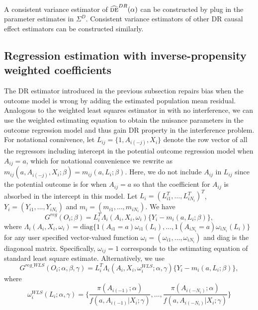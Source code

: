 \documentclass[oupdraft]{bio}
\begin{document}

A consistent variance estimator of $\widehat{\textsc{de}}^{DR}(\alpha)$ can be constructed by plug in the parameter estimates in $\Sigma^D$. Consistent variance estimators of other DR causal effect estimators can be constructed similarly.


\subsection{Regression estimation with inverse-propensity weighted coefficients}\label{subsec: DR_WLS}


The DR estimator introduced in the previous subsection repairs bias when the outcome model is wrong by adding the estimated population mean residual. Analogous to the weighted least squares estimator in \citet{kang2007demystifying} with no interference, we can use the weighted estimating equation to obtain the nuisance parameters in the outcome regression model and thus gain DR property in the interference problem. For notational connivence, let $L_{ij}=\{1,A_{i(-j)},X_i\}$ denote the row vector of all the regressors including intercept in the potential outcome regression model when $A_{ij}=a$, which for notational convenience we rewrite as $m_{ij}(a,A_{i(-j)},X_i;\beta)=m_{ij}(a,L_i;\beta)$. Here, we do not include $A_{ij}$ in $L_{ij}$ since the potential outcome is for when $A_{ij}=a$ so that the coefficient for $A_{ij}$ is absorbed in the intercept in this model. Let $L_i=(L_{i1}^T,\ldots,L_{iN_i}^T)^T$, $Y_i=(Y_{i1},\ldots,Y_{iN_i})$ and $ m_i=(m_{i1},\ldots,m_{iN_i})$. We have $$G^{reg}(O_i;\beta)=L_i^T\Lambda_i(A_i,X_i,\omega_{i})\{Y_i- m_i(a,L_i;\beta)\},$$ 
where  $\Lambda_i(A_i,X_i,\omega_{i})=\text{diag}\biggl\{1(A_{i1}=a)\omega_{i1}(L_{i}),\ldots,1(A_{iN_i}=a)\omega_{iN_i}(L_{i})\biggr\}$ for any user specified vector-valued  function $\omega_{i}=(\omega_{i1},\ldots,\omega_{iN_i})$ and diag is the diagonoal matrix. Specifically, $\omega_{ij}=1$ corresponds to the estimating equation of standard least square estimate. Alternatively, we use $$G^{reg\_WLS}(O_i;\alpha,\beta,\gamma)=L_i^T\Lambda_i(A_i,X_i,\omega_{i}^{WLS};\alpha,\gamma)\{Y_i- m_i(a,L_i;\beta)\},$$ where
$$\omega_i^{WLS}(L_i;\alpha,\gamma)=\biggl\{\frac{\pi(A_{i(-1)};\alpha)}{{f}(a,A_{i(-1)}|X_i;\gamma)}
  ,\ldots,\frac{\pi(A_{i(-N_i)};\alpha)}{{f}(a,A_{i(-N_i)}|X_i;\gamma)}
  \biggr\}$$
  
\end{document}
